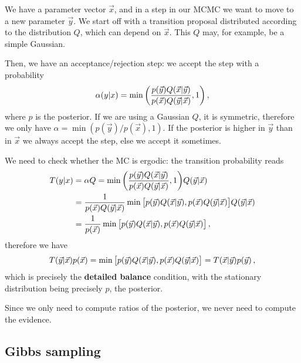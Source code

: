 \documentclass[main.tex]{subfiles}
\begin{document}

We have a parameter vector \(\vec{x}\), and in a step in our MCMC we want to move to a new parameter \(\vec{y}\). 
We start off with a transition proposal distributed according to the distribution \(Q\), which can depend on \(\vec{x}\).
This \(Q\) may, for example, be a simple Gaussian. 

Then, we have an acceptance/rejection step: we accept the step with a probability 
%
\begin{align}
\alpha (y | x) = \min \qty(\frac{p(\vec{y}) Q(\vec{x} | \vec{y})}{p(\vec{x}) Q(\vec{y} | \vec{x})}, 1)
\,,
\end{align}
%
where \(p\) is the posterior.
If we are using a Gaussian \(Q\), it is symmetric, therefore we only have \(\alpha = \min (p(\vec{y}) / p (\vec{x}), 1)\). 
If the posterior is higher in \(\vec{y}\) than in \(\vec{x}\) we always accept the step, else we accept it sometimes. 

We need to check whether the MC is ergodic: the transition probability reads 
%
\begin{align}
T(y | x) &= \alpha Q = 
\min \qty(\frac{p(\vec{y}) Q(\vec{x} | \vec{y})}{p(\vec{x}) Q(\vec{y} | \vec{x})}, 1)
Q(\vec{y} | \vec{x})  \\
&= \frac{1}{p(\vec{x}) Q(\vec{y} |\vec{x})} \min \qty[p(\vec{y} ) Q(\vec{x} | \vec{y}), p(\vec{x}) Q(\vec{y} | \vec{x})]
Q(\vec{y} | \vec{x})  \\
&= \frac{1}{p(\vec{x})} \min \qty[p(\vec{y} ) Q(\vec{x} | \vec{y}), p(\vec{x}) Q(\vec{y} | \vec{x})]
\,,
\end{align}
%
therefore we have 
%
\begin{align}
T(\vec{y} | \vec{x}) p(\vec{x}) = \min \qty[p(\vec{y} ) Q(\vec{x} | \vec{y}), p(\vec{x}) Q(\vec{y} | \vec{x})]
= T(\vec{x} | \vec{y}) p(\vec{y})
\,,
\end{align}
%
which is precisely the \textbf{detailed balance} condition, with the stationary distribution being precisely \(p\), the posterior. 

Since we only need to compute ratios of the posterior, we never need to compute the evidence. 

\subsection{Gibbs sampling}
\end{document}
